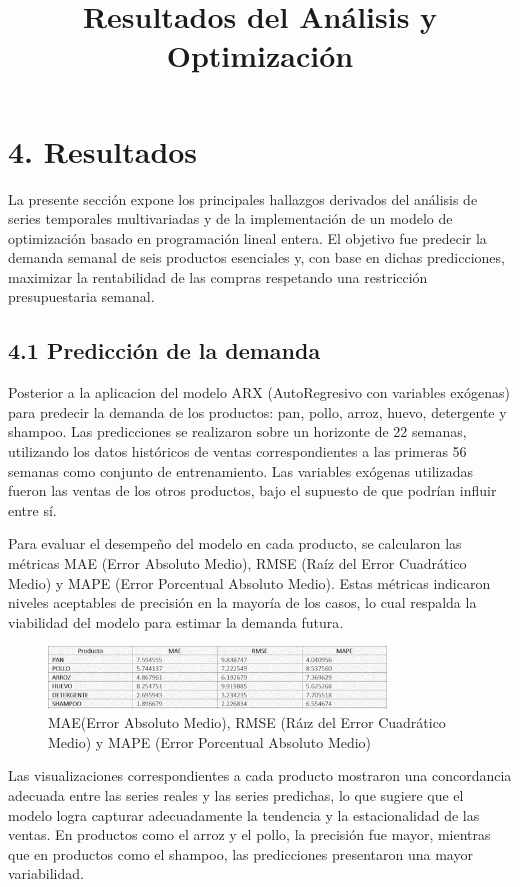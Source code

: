 \documentclass[12pt]{article}
\title{Resultados del Análisis y Optimización}
\author{}
\date{}
\begin{document}
\section*{4. Resultados}

La presente sección expone los principales hallazgos derivados del análisis de series temporales multivariadas y de la implementación de un modelo de optimización basado en programación lineal entera. El objetivo fue predecir la demanda semanal de seis productos esenciales y, con base en dichas predicciones, maximizar la rentabilidad de las compras respetando una restricción presupuestaria semanal.

\subsection*{4.1 Predicción de la demanda}

Posterior a la aplicacion del modelo ARX (AutoRegresivo con variables exógenas) para predecir la demanda de los productos: pan, pollo, arroz, huevo, detergente y shampoo. Las predicciones se realizaron sobre un horizonte de 22 semanas, utilizando los datos históricos de ventas correspondientes a las primeras 56 semanas como conjunto de entrenamiento. Las variables exógenas utilizadas fueron las ventas de los otros productos, bajo el supuesto de que podrían influir entre sí.

Para evaluar el desempeño del modelo en cada producto, se calcularon las métricas MAE (Error Absoluto Medio), RMSE (Raíz del Error Cuadrático Medio) y MAPE (Error Porcentual Absoluto Medio). Estas métricas indicaron niveles aceptables de precisión en la mayoría de los casos, lo cual respalda la viabilidad del modelo para estimar la demanda futura.
\begin{figure}[H]
    \centering
    \includegraphics[width=0.8\textwidth]{error.png}
    \caption{MAE(Error Absoluto Medio), RMSE (Ráız del Error Cuadrático Medio) y MAPE (Error Porcentual Absoluto Medio)}
\end{figure}
Las visualizaciones correspondientes a cada producto mostraron una concordancia adecuada entre las series reales y las series predichas, lo que sugiere que el modelo logra capturar adecuadamente la tendencia y la estacionalidad de las ventas. En productos como el arroz y el pollo, la precisión fue mayor, mientras que en productos como el shampoo, las predicciones presentaron una mayor variabilidad.
\end{document}
